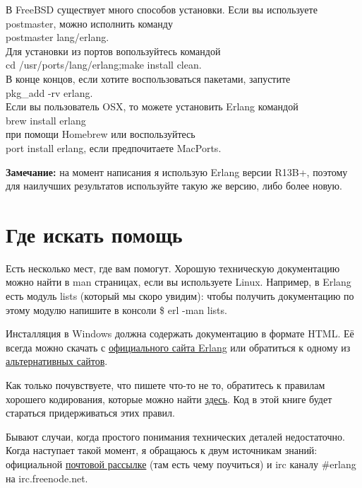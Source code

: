 \documentclass[a4paper,12pt]{report}
\newcommand{\ops}{\colorbox{lgreen}}
\begin{document}
В FreeBSD существует много способов установки. Если вы используете \ops{postmaster}, можно исполнить команду\\ 
\ops{postmaster lang/erlang}.\\ 
Для установки из портов вопользуйтесь командой\\ 
\ops{cd /usr/ports/lang/erlang;make install clean}.\\ 
В конце концов, если хотите воспользоваться пакетами, запустите\\  
\ops{pkg\_add -rv erlang}.\\ 
Если вы пользователь OSX, то можете установить Erlang командой\\ 
\ops{brew install erlang}\\ 
при помощи Homebrew или воспользуйтесь\\ 
\ops{port install erlang}, если предпочитаете MacPorts.\\ 
\colorbox{lgray}
{
\begin{minipage}{1.0\linewidth}
\textbf{Замечание:} на момент написания я использую Erlang версии R13B+, поэтому для наилучших результатов используйте такую же версию, либо более новую.
\end{minipage}
}
\section{Где искать помощь}
Есть несколько мест, где вам помогут. Хорошую техническую документацию можно найти в man страницах, если вы используете Linux. Например, в Erlang есть модуль lists (который мы скоро увидим): чтобы получить документацию по этому модулю напишите в консоли \ops{\$ erl -man lists}.

Инсталляция в Windows должна содержать документацию в формате HTML. Её всегда можно скачать с \href{http://erlang.org/doc/}{официального сайта Erlang} или обратиться к одному из \href{http://erldocs.com}{альтернативных сайтов}.

Как только почувствуете, что пишете что\--то не то, обратитесь к правилам хорошего кодирования, которые можно найти \href{http://www.erlang.se/doc/programming_rules.shtml}{здесь}. Код в этой книге будет стараться придерживаться этих правил.

Бывают случаи, когда простого понимания технических деталей недостаточно. Когда наступает такой момент, я обращаюсь к двум источникам знаний: официальной \href{http://www.erlang.org/static/doc/mailinglist.html}{почтовой рассылке} (там есть чему поучиться) и irc каналу \#erlang на irc.freenode.net.
\end{document}
